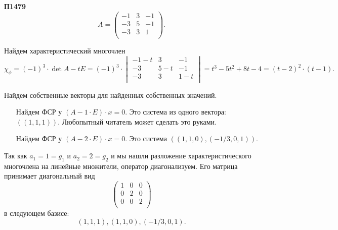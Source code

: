 \documentclass[a4paper]{article}
\begin{document}
    \begin{options}
    \item[\textbf{П1479}]
        \begin{equation*}
            A = \begin{pmatrix}
                -1 & 3 & -1 \\
                -3 & 5 & -1 \\
                -3 & 3 & 1 \\
            \end{pmatrix}.
        \end{equation*}

        \begin{solution}
            Найдем характеристический многочлен
            \begin{equation*}
                \chi_{\phi} = (-1)^{3} \cdot \det{A - tE} = 
                (-1)^3 \cdot
                \begin{vmatrix}
                    -1 - t & 3 & -1 \\
                    -3 & 5 - t & -1 \\
                    -3 & 3 & 1 - t \\
                \end{vmatrix}
                = t^3 - 5t^2 + 8t - 4
                = (t - 2)^2 \cdot (t - 1).
            \end{equation*}

            Найдем собственные векторы для найденных собственных значений.
            \begin{itemize}
            \item[\pmb{$t_1 = 1$}]
                Найдем ФСР у $(A - 1 \cdot E) \cdot x = 0$. Это система из одного вектора: $((1, 1, 1))$. Любопытный читатель может сделать это руками.

            \item[\pmb{$t_2 = t_3 = 2$}]
                Найдем ФСР у $(A - 2 \cdot E) \cdot x = 0$. Это система $((1, 1, 0), (-1/3, 0, 1))$.
            \end{itemize}

            Так как $a_1 = 1 = g_1$ и $a_2 = 2 = g_2$ и мы нашли разложение характеристического многочлена на линейные множители, оператор диагонализуем. Его матрица принимает диагональный вид
            \begin{equation*}
                \begin{pmatrix}
                    1 & 0 & 0 \\
                    0 & 2 & 0 \\
                    0 & 0 & 2 \\
                \end{pmatrix}
            \end{equation*}
            в следующем базисе:
            \begin{equation*}
                (1, 1, 1), (1, 1, 0), (-1/3, 0, 1).
            \end{equation*}
        \end{solution}


\end{options}
\end{document}
